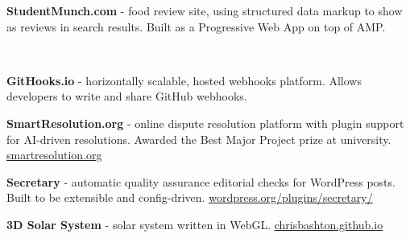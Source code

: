 \documentclass[10pt,a4paper,ragged2e,withhyper]{altacv}
\begin{document}
\begin{paracol}{2}
\def\spacer{0.7cm}

\textbf{StudentMunch.com} - food review site, using structured data markup to show as reviews in search results. Built as a Progressive Web App on top of AMP.

\medskip

  \\

\vspace{\spacer}

\textbf{GitHooks.io} - horizontally scalable, hosted webhooks platform. Allows developers to write and share GitHub webhooks.

\medskip


\vspace{\spacer}

\textbf{SmartResolution.org} - online dispute resolution platform with plugin support for AI-driven resolutions. Awarded the Best Major Project prize at university.
\newline
\href{https://smartresolution.org}{\url{smartresolution.org}}

\medskip


\vspace{\spacer}

\textbf{Secretary} - automatic quality assurance editorial checks for WordPress posts. Built to be extensible and config-driven.
\newline
\href{https://wordpress.org/plugins/secretary/}{\url{wordpress.org/plugins/secretary/}}

\medskip


\vspace{\spacer}

\textbf{3D Solar System} - solar system written in WebGL.
\newline
\href{https://chrisbashton.github.io}{\url{chrisbashton.github.io}}

\medskip




\customreferences

\end{paracol}
\end{document}
